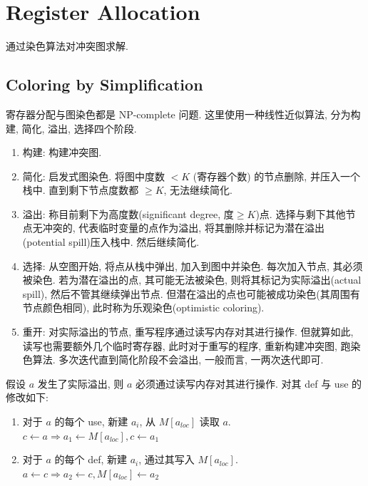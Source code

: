 \newpage
\section{Register Allocation}
通过染色算法对冲突图求解.
\subsection{Coloring by Simplification}
寄存器分配与图染色都是 NP-complete 问题. 这里使用一种线性近似算法, 分为构建, 简化, 溢出, 选择四个阶段. 

\begin{enumerate}
    \item 构建: 构建冲突图.
    \item 简化: 启发式图染色. 将图中度数 $<K$ (寄存器个数) 的节点删除, 并压入一个栈中. 直到剩下节点度数都 $\ge K$, 无法继续简化. 
    \item 溢出: 称目前剩下为高度数(significant degree, 度$\ge K$)点. 选择与剩下其他节点无冲突的, 代表临时变量的点作为溢出, 将其删除并标记为潜在溢出(potential spill)压入栈中. 然后继续简化. 
    \item 选择: 从空图开始, 将点从栈中弹出, 加入到图中并染色.  每次加入节点, 其必须被染色. 
    \subitem 若为潜在溢出的点, 其可能无法被染色, 则将其标记为实际溢出(actual spill), 然后不管其继续弹出节点. 
    \subitem 但潜在溢出的点也可能被成功染色(其周围有节点颜色相同), 此时称为乐观染色(optimistic coloring).
    \item 重开: 对实际溢出的节点, 重写程序通过读写内存对其进行操作. 但就算如此, 读写也需要额外几个临时寄存器, 此时对于重写的程序, 重新构建冲突图, 跑染色算法. 多次迭代直到简化阶段不会溢出, 一般而言, 一两次迭代即可. 
\end{enumerate}

假设 $a$ 发生了实际溢出, 则 $a$ 必须通过读写内存对其进行操作. 对其 def 与 use 的修改如下:
\begin{enumerate}
    \item 对于 $a$ 的每个 use, 新建 $a_i$, 从 $M[a_{loc}]$ 读取 $a$. 
    \subitem $c\leftarrow a \Rightarrow a_1\leftarrow M[a_{loc}], c\leftarrow a_1$
    \item 对于 $a$ 的每个 def, 新建 $a_i$, 通过其写入 $M[a_{loc}]$.
    \subitem $a\leftarrow c \Rightarrow a_2\leftarrow c, M[a_{loc}]\leftarrow a_2$
\end{enumerate}

